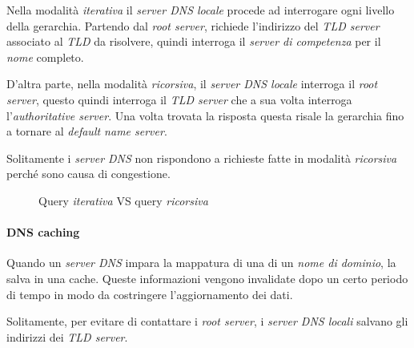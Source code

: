 Nella modalità \emph{iterativa} il \emph{server DNS locale} procede ad interrogare
ogni livello della gerarchia. Partendo dal \emph{root server}, richiede l'indirizzo
del \emph{TLD server} associato al \emph{TLD} da risolvere, quindi interroga il
\emph{server di competenza} per il \emph{nome} completo.

D'altra parte, nella modalità \emph{ricorsiva}, il \emph{server DNS locale}
interroga il \emph{root server}, questo quindi interroga il \emph{TLD server} che
a sua volta interroga l'\emph{authoritative server}. Una volta trovata la risposta
questa risale la gerarchia fino a tornare al \emph{default name server}.

Solitamente i \emph{server DNS} non rispondono a richieste fatte in modalità
\emph{ricorsiva} perché sono causa di congestione.

\newpage
\begin{figure}[ht]
    \centering
    \hfill
    \caption{Query \emph{iterativa} VS query \emph{ricorsiva}}
\end{figure}

\paragraph{DNS caching}
Quando un \emph{server DNS} impara la mappatura di una di un \emph{nome di dominio},
la salva in una cache. Queste informazioni vengono invalidate dopo un certo periodo
di tempo in modo da costringere l'aggiornamento dei dati.

Solitamente, per evitare di contattare i \emph{root server}, i \emph{server DNS
locali} salvano gli indirizzi dei \emph{TLD server}.

